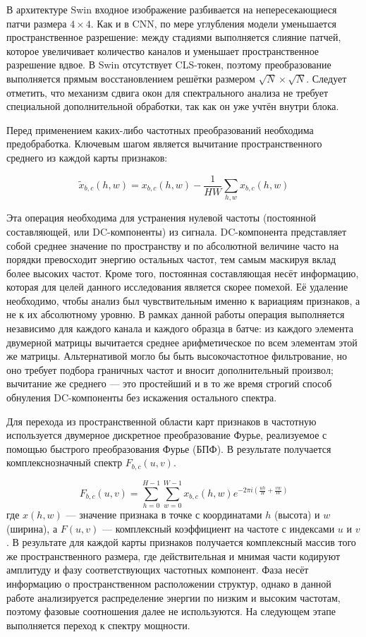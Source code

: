В архитектуре Swin входное изображение разбивается на непересекающиеся патчи размера $4\times4$. Как и в CNN, по мере углубления модели уменьшается пространственное разрешение: между стадиями выполняется слияние патчей, которое увеличивает количество каналов и уменьшает пространственное разрешение вдвое. В Swin отсутствует CLS-токен, поэтому преобразование выполняется прямым восстановлением решётки размером $\sqrt{N} \times \sqrt{N}$. Следует отметить, что механизм сдвига окон для спектрального анализа не требует специальной дополнительной обработки, так как он уже учтён внутри блока.

Перед применением каких-либо частотных преобразований необходима предобработка.
Ключевым шагом является вычитание пространственного среднего из каждой карты признаков:

\begin{equation}
    \tilde{x}_{b,c}(h,w) = x_{b,c}(h,w) - \frac{1}{HW} \sum_{h,w} x_{b,c}(h,w)
\end{equation}

Эта операция необходима для устранения нулевой частоты (постоянной составляющей, или DC-компоненты) из сигнала. DC-компонента представляет собой среднее значение по пространству и по абсолютной величине часто на порядки превосходит энергию остальных частот, тем самым маскируя вклад более высоких частот. Кроме того, постоянная составляющая несёт информацию, которая для целей данного исследования является скорее помехой. Её удаление необходимо, чтобы анализ был чувствительным именно к вариациям признаков, а не к их абсолютному уровню.
В рамках данной работы операция выполняется независимо для каждого канала и каждого образца в батче: из каждого элемента двумерной матрицы вычитается среднее арифметическое по всем элементам этой же матрицы. Альтернативой могло бы быть высокочастотное фильтрование, но оно требует подбора граничных частот и вносит дополнительный произвол; вычитание же среднего — это простейший и в то же время строгий способ обнуления DC-компоненты без искажения остального спектра.

Для перехода из пространственной области карт признаков в частотную используется двумерное дискретное преобразование Фурье, реализуемое с помощью быстрого преобразования Фурье (БПФ). В результате получается комплекснозначный спектр $F_{b,c}(u,v)$. 

\begin{equation}
    F_{b,c}(u, v) = \sum_{h=0}^{H-1} \sum_{w=0}^{W-1} x_{b,c}(h, w) e^{-2\pi i \left( \frac{uh}{H} + \frac{vw}{W} \right)}
\end{equation}
где $x(h,w)$ — значение признака в точке с координатами $h$ (высота) и $w$ (ширина), а $F(u,v)$ — комплексный коэффициент на частоте с индексами $u$ и $v$.
В результате для каждой карты признаков получается комплексный массив того же пространственного размера, где действительная и мнимая части кодируют амплитуду и фазу соответствующих частотных компонент. Фаза несёт информацию о пространственном расположении структур, однако в данной работе анализируется распределение энергии по низким и высоким частотам, поэтому фазовые соотношения далее не используются. На следующем этапе выполняется переход к спектру мощности.

